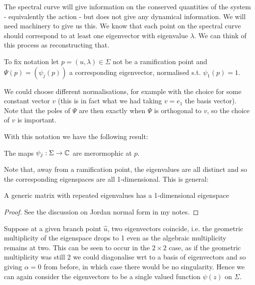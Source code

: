 \documentclass{article}
\begin{document}
The spectral curve will give information on the conserved quantities of the system - equivalently the action - but does not give any dynamical information. We will need machinery to give us this. We know that each point on the spectral curve should correspond to at least one eigenvector with eigenvalue $\lambda$. We can think of this process as reconstructing that. 
\begin{notation}
	To fix notation let $p = (u,\lambda) \in \Sigma$ not be a ramification point and $\Psi(p) = (\psi_j(p))$ a corresponding eigenvector, normalised s.t. $\psi_1(p)=1$.
	\end{notation}

\begin{remark}
We could choose different normalisations, for example with the choice 
	for some constant vector $v$ (this is in fact what we had taking $v=e_1$ the basis vector).  Note that the poles of $\Psi$ are then exactly when $\Psi$ is orthogonal to $v$, so the choice of $v$ is important.  
\end{remark}

With this notation we have the following result:

\begin{prop}
	The maps $\psi_j:\Sigma \to \mathbb{C}$ are merormophic at $p$. 
\end{prop}

Note that, away from a ramification point, the eigenvalues are all distinct and so the corresponding eigenspaces are all 1-dimensional. This is general:

\begin{prop}
	A generic matrix with repeated eigenvalues has a 1-dimensional eigenspace
\end{prop}
\begin{proof}
	See the discussion on Jordan normal form in my notes. 
\end{proof}

\begin{example}
	Suppose at a given branch point $\hat{u}$, two eigenvectors coincide, i.e. the geometric multiplicity of the eigenspace drops to 1 even as the algebraic multiplicity remains at two. This can be seen to occur in the $2 \times 2$ case, as if the geometric multiplicity was still 2 we could diagonalise wrt to a basis of eigenvectors and so 
	giving $\alpha = 0$ from before, in which case there would be no singularity. Hence we can again consider the eigenvectors to be a single valued function $\psi(z)$ on $\Sigma$. 
\end{example}
\end{document}
